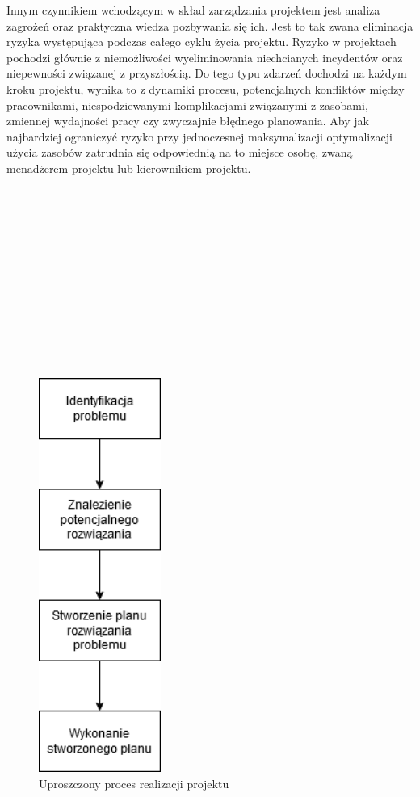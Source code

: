 \documentclass[oneside,polski,logo]{amuthesis}
\begin{document}
Innym czynnikiem wchodzącym w skład zarządzania projektem jest analiza zagrożeń oraz praktyczna wiedza pozbywania się ich. Jest to tak zwana eliminacja ryzyka występująca podczas całego cyklu życia projektu. Ryzyko w projektach pochodzi głównie z niemożliwości wyeliminowania niechcianych incydentów oraz niepewności związanej z przyszłością. Do tego typu zdarzeń dochodzi na każdym kroku projektu, wynika to z dynamiki procesu, potencjalnych konfliktów między pracownikami, niespodziewanymi komplikacjami związanymi z zasobami, zmiennej wydajności pracy czy zwyczajnie błędnego planowania. Aby jak najbardziej ograniczyć ryzyko przy jednoczesnej maksymalizacji optymalizacji użycia zasobów zatrudnia się odpowiednią na to miejsce osobę, zwaną menadżerem projektu lub kierownikiem projektu. \\ \\ \\ \\ \\ \\ \\ \\ \\ \\ \\ \\ \\

\begin{figure}[h]
	\centering
	\includegraphics[width=4cm]{images/hyps/diagram-zarzadzania-projektem.png}
	\caption{Uproszczony proces realizacji projektu}
\end{figure}
\end{document}
